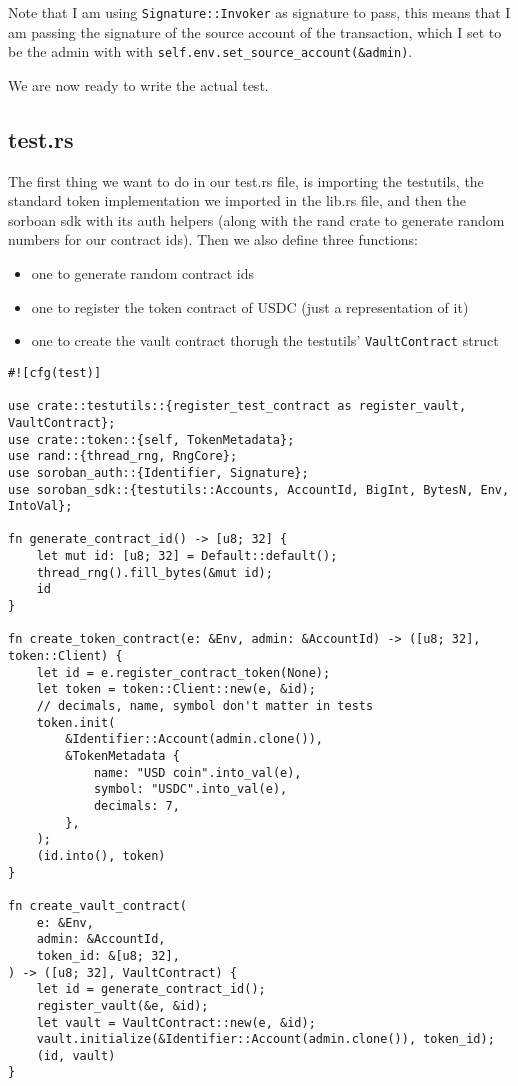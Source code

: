 \documentclass{article}
\newcommand{\inl}[1]{\lstinline{#1}}
\begin{document}
Note that I am using \inl{Signature::Invoker} as signature to pass, this means that I am passing the signature of the source account of the transaction, which I set to be the admin with with \inl{self.env.set_source_account(&admin)}.

We are now ready to write the actual test.

\subsection{test.rs}
The first thing we want to do in our test.rs file, is importing the testutils, the standard token implementation we imported in the lib.rs file, and then the sorboan sdk with its auth helpers (along with the rand crate to generate random numbers for our contract ids). Then we also define three functions:

\begin{itemize}
\item one to generate random contract ids
\item one to register the token contract of USDC (just a representation of it)
\item one to create the vault contract thorugh the testutils' \inl{VaultContract} struct
\end{itemize}

\begin{lstlisting}
#![cfg(test)]

use crate::testutils::{register_test_contract as register_vault, VaultContract};
use crate::token::{self, TokenMetadata};
use rand::{thread_rng, RngCore};
use soroban_auth::{Identifier, Signature};
use soroban_sdk::{testutils::Accounts, AccountId, BigInt, BytesN, Env, IntoVal};

fn generate_contract_id() -> [u8; 32] {
    let mut id: [u8; 32] = Default::default();
    thread_rng().fill_bytes(&mut id);
    id
}

fn create_token_contract(e: &Env, admin: &AccountId) -> ([u8; 32], token::Client) {
    let id = e.register_contract_token(None);
    let token = token::Client::new(e, &id);
    // decimals, name, symbol don't matter in tests
    token.init(
        &Identifier::Account(admin.clone()),
        &TokenMetadata {
            name: "USD coin".into_val(e),
            symbol: "USDC".into_val(e),
            decimals: 7,
        },
    );
    (id.into(), token)
}

fn create_vault_contract(
    e: &Env,
    admin: &AccountId,
    token_id: &[u8; 32],
) -> ([u8; 32], VaultContract) {
    let id = generate_contract_id();
    register_vault(&e, &id);
    let vault = VaultContract::new(e, &id);
    vault.initialize(&Identifier::Account(admin.clone()), token_id);
    (id, vault)
}
\end{lstlisting}
\end{document}
